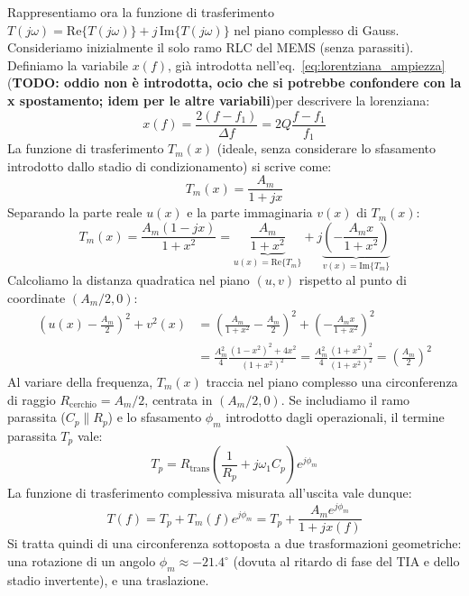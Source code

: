 \documentclass[11pt,a4paper]{article}
\begin{document}
\noindent Rappresentiamo ora la funzione di trasferimento $T(j\omega) = \mathrm{Re}\{T(j\omega)\} + j\,\mathrm{Im}\{T(j\omega)\}$ nel piano complesso di Gauss. 
Consideriamo inizialmente il solo ramo RLC del MEMS (senza parassiti). Definiamo la variabile $x(f)$, già introdotta nell'eq.~\eqref{eq:lorentziana_ampiezza} (\textbf{TODO: oddio non è introdotta, ocio che si potrebbe confondere con la x spostamento; idem per le altre variabili})per descrivere la lorenziana:
\begin{equation}
    \label{eq:coordinata_x_lorentz}
    x(f) = \frac{2(f - f_1)}{\Delta f} = 2Q \frac{f - f_1}{f_1}
\end{equation}
La funzione di trasferimento $T_m(x)$ (ideale, senza considerare lo sfasamento introdotto dallo stadio di condizionamento) si scrive come:
\begin{equation}
    T_m(x) = \frac{A_m}{1 + j x}
\end{equation}
Separando la parte reale $u(x)$ e la parte immaginaria $v(x)$ di $T_m(x)$:
\begin{equation}
    T_m(x) = \frac{A_m(1 - jx)}{1 + x^2} = \underbrace{\frac{A_m}{1 + x^2}}_{u(x) = \mathrm{Re}\{T_m\}} + j \underbrace{\left(-\frac{A_m x}{1 + x^2}\right)}_{v(x) = \mathrm{Im}\{T_m\}}
\end{equation}
Calcoliamo la distanza quadratica nel piano $(u, v)$ rispetto al punto di coordinate $(A_m/2, 0)$:
\begin{align}
    \left(u(x) - \frac{A_m}{2}\right)^2 + v^2(x) &= \left(\frac{A_m}{1 + x^2} - \frac{A_m}{2}\right)^2 + \left(-\frac{A_m x}{1 + x^2}\right)^2 \nonumber \\
    &= \frac{A_m^2}{4} \frac{(1 - x^2)^2 + 4x^2}{(1 + x^2)^2} = \frac{A_m^2}{4} \frac{(1 + x^2)^2}{(1 + x^2)^2} = \left(\frac{A_m}{2}\right)^2
\end{align}
Al variare della frequenza, $T_m(x)$ traccia nel piano complesso una circonferenza di raggio $R_{\text{cerchio}} = A_m/2$, centrata in $(A_m/2, 0)$. Se includiamo il ramo parassita ($C_p \parallel R_p$) e lo sfasamento $\phi_m$ introdotto dagli operazionali, il termine parassita $T_p$ vale:
\begin{equation}
    T_p = R_{\text{trans}} \left( \frac{1}{R_p} + j\omega_1 C_p \right) e^{j\phi_m}
\end{equation}
La funzione di trasferimento complessiva misurata all'uscita vale dunque:
\begin{equation}
    \label{eq:cerchio_traslato_complesso}
    T(f) = T_p + T_m(f) e^{j\phi_m} = T_p + \frac{A_m e^{j\phi_m}}{1 + j x(f)}
\end{equation}
Si tratta quindi di una circonferenza sottoposta a due trasformazioni geometriche: una rotazione di un angolo $\phi_m \approx -21.4^\circ$ (dovuta al ritardo di fase del TIA e dello stadio invertente), e una traslazione.
\vspace{0.3cm}
\end{document}
